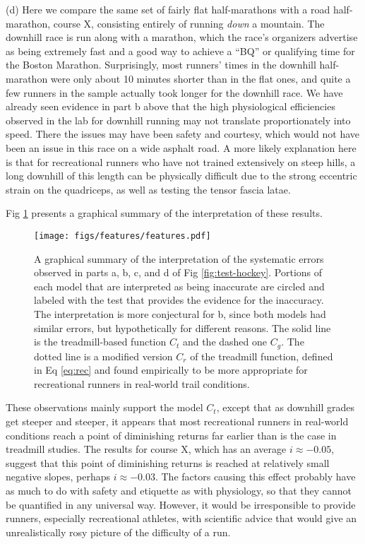 \documentclass[10pt,letterpaper]{article}
\begin{document}
(d) Here we compare the same set of fairly flat half-marathons with a road half-marathon, course X, consisting entirely
of running \emph{down} a mountain. The downhill race is run along with a marathon, which
the race's organizers advertise as being extremely fast and a good way to achieve a ``BQ'' or
qualifying time for the Boston Marathon. Surprisingly, most runners' times in the downhill
half-marathon were only about 10 minutes shorter than in the flat ones, and quite a few runners in
the sample actually took longer for the downhill race. We have already seen evidence in part
b above that the high physiological efficiencies observed in the lab for downhill running may
not translate proportionately into speed. There the issues may have been safety and courtesy,
which would not have been an issue in this race on a wide asphalt road. A more likely explanation
here is that for recreational runners who have not trained extensively on steep hills, a long downhill of this
length can be physically difficult due to the strong eccentric strain on the quadriceps, as well as
testing the tensor fascia latae.

Fig \ref{fig:features} presents a graphical summary of the interpretation of these results.

\begin{figure}[h]
\texttt{[image: figs/features/features.pdf]}
\centering
\caption{A graphical summary of the interpretation of the systematic errors observed
in parts a, b, c, and d of Fig \ref{fig:test-hockey}. Portions of each model that are
interpreted as being inaccurate are circled and labeled with the test that provides the
evidence for the inaccuracy. The interpretation is more conjectural for b, since both
models had similar errors, but hypothetically for different reasons.
The solid line is the treadmill-based function $C_t$ and the dashed one $C_g$.
The dotted line is a modified version $C_r$ of the treadmill function, defined in Eq \ref{eq:rec} and found
empirically to be more appropriate for recreational runners in real-world trail conditions.}
\label{fig:features}
\end{figure}

These observations mainly support the model $C_t$, except that as
downhill grades get steeper and steeper, it appears that most
recreational runners in real-world conditions reach a point of
diminishing returns far earlier than is the case in treadmill studies.
The results for course X, which has an average $i\approx -0.05$,
suggest that this point of diminishing returns is reached at relatively
small negative slopes, perhaps $i\approx -0.03$.
The factors causing this effect probably have as much to do with safety and etiquette as
with physiology, so that they cannot be quantified in any
universal way. However, it would be irresponsible to provide runners,
especially recreational athletes, with scientific advice that would
give an unrealistically rosy picture of the difficulty of a run.
\end{document}
